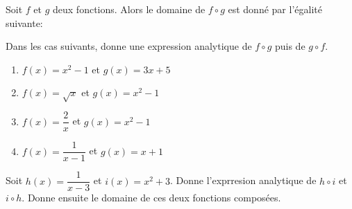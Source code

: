 \documentclass[a4paper,12pt]{report}
\begin{document}
\begin{propriete}
Soit \(f\) et \(g\) deux fonctions. Alors le domaine de \(f\circ g\) est donné par
l'égalité suivante:
\vspace{1cm}
\end{propriete}

\begin{exercice}
Dans les cas suivants, donne une expression analytique de \(f\circ g\) puis de
\(g\circ f\).

\par \setlength{\columnseprule}{0 pt}
          \begin{minipage}[t]{\linewidth}
          \begin{multicols}{2}
\begin{enumerate}
\item \(f(x)=x^2-1\) et \(g(x)=3x+5\)

\item \(f(x)=\sqrt{x}\) et \(g(x)=x^2-1\)

\item \(f(x)=\dfrac{2}{x}\) et \(g(x)=x^2-1\)

\item \(f(x)=\dfrac{1}{x-1}\) et \(g(x)=x+1\)
\end{enumerate}


\end{multicols}\end{minipage}
\end{exercice}

\begin{exercice}
Soit \(h(x)=\dfrac{1}{x-3}\) et \(i(x)=x^2+3\). Donne l'exprresion analytique de \(h\circ i\) et \(i\circ
h\). Donne ensuite le domaine de ces deux fonctions composées.
\end{exercice}
\end{document}
